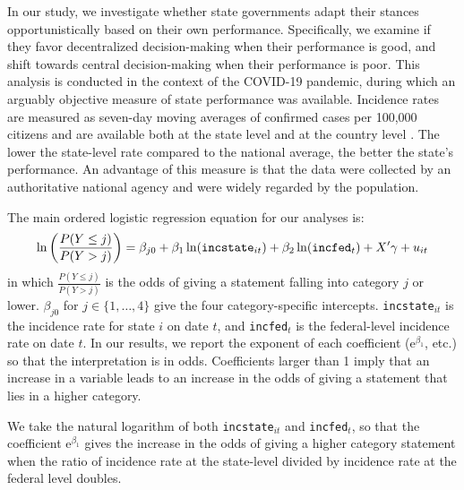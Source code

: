 \documentclass[12pt, abstracton]{scrartcl}
\begin{document}
In our study, we investigate whether state governments adapt their stances opportunistically based on their own performance. Specifically, we examine if they favor decentralized decision-making when their performance is good, and shift towards central decision-making when their performance is poor. This analysis is conducted in the context of the COVID-19 pandemic, during which an arguably objective measure of state performance was available. Incidence rates are measured as seven-day moving averages of confirmed cases per 100,000 citizens and are available both at the state level and at the country level \citep{Guidotti2022}.
The lower the state-level rate compared to the national average, the better the state's performance. An advantage of this measure is that the data were collected by an authoritative national agency and were widely regarded by the population.

The main ordered logistic regression equation for our analyses is:
\begin{equation} \label{eq.regression01}
 \ln \left( \frac{P(Y \leq j)}{P(Y > j)} \right) = \beta_{j0} + \beta_1 \ln(\text{\texttt{incstate}}_{it}) + \beta_2 \ln(\text{\texttt{incfed}}_{t}) + X' \gamma + u_{it} 
\end{equation}
in which $\frac{P(Y \leq j)}{P(Y > j)}$ is the odds of giving a statement falling into category $j$ or lower. $\beta_{j0}$ for $j \in \{1,\ldots,4\}$ give the four category-specific intercepts. \texttt{incstate}$_{it}$ is the incidence rate for state $i$ on date $t$, and \texttt{incfed}$_{t}$ is the federal-level incidence rate on date $t$. In our results, we report the exponent of each coefficient ($\mathrm{e}^{\beta_1}$, etc.) so that the interpretation is in odds. Coefficients larger than 1 imply that an increase in a variable leads to an increase in the odds of giving a statement that lies in a higher category. 

We take the natural logarithm of both \texttt{incstate}$_{it}$ and \texttt{incfed}$_{t}$, so that the coefficient $\mathrm{e}^{\beta_1}$ gives the increase in the odds of giving a higher category statement when the ratio of incidence rate at the state-level divided by incidence rate at the federal level doubles.
\end{document}
